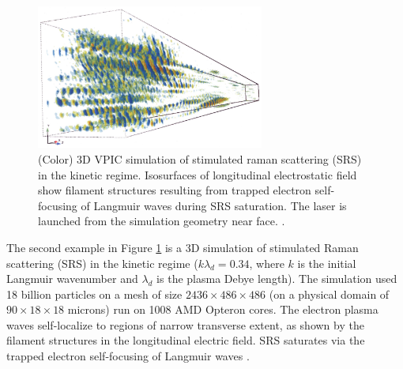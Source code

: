 \documentclass[aps,prl,preprint,preprintnumbers,groupedaddress]{revtex4}
\newcommand{\fig}[1]{Figure \ref{fig:#1}}
\begin{document}
\begin{figure}
\centering
\includegraphics[width=75mm]{stimulated_raman_scattering.eps}
\caption{\label{fig:stimulated_raman_scattering}
(Color) 3D VPIC simulation of stimulated raman scattering (SRS) in the
kinetic regime.  Isosurfaces of longitudinal electrostatic field show
filament structures resulting from trapped electron self-focusing of
Langmuir waves during SRS saturation.  The laser is launched from the
simulation geometry near face.
\cite{Yin_et_al_Phys_Plasmas_2007_SRS}.}
\end{figure}

The second example in \fig{stimulated_raman_scattering} is a 3D
simulation of stimulated Raman scattering (SRS) in the kinetic regime
($k \lambda_d = 0.34$, where $k$ is the initial Langmuir wavenumber
and $\lambda_d$ is the plasma Debye length).  The simulation used 18
billion particles on a mesh of size $2436 \times 486 \times 486$ (on a
physical domain of $90\times18\times18$ microns) run on 1008 AMD
Opteron cores.  The electron plasma waves self-localize to regions of
narrow transverse extent, as shown by the filament structures in the
longitudinal electric field.  SRS saturates via the trapped electron
self-focusing of Langmuir waves
\cite{Yin_et_al_Phys_Plasmas_2007_SRS}.
\end{document}
